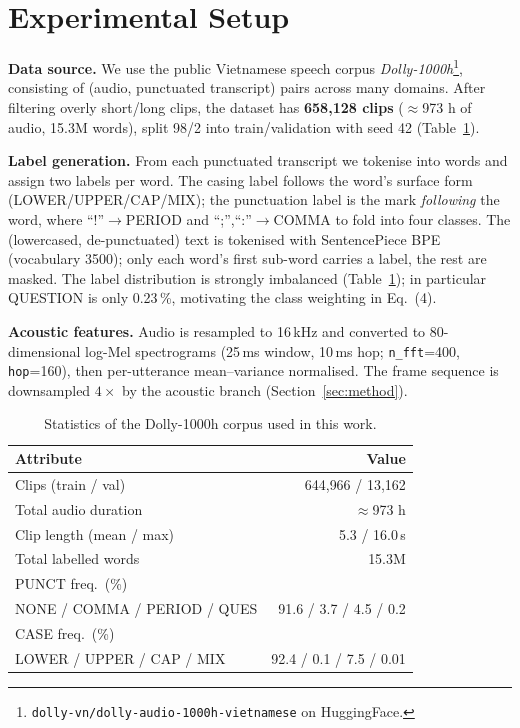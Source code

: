 \documentclass[conference]{IEEEtran}
\begin{document}
\section{Experimental Setup}

\textbf{Data source.} We use the public Vietnamese speech corpus
\emph{Dolly-1000h}\footnote{\texttt{dolly-vn/dolly-audio-1000h-vietnamese} on
HuggingFace.}, consisting of (audio, punctuated transcript) pairs across many
domains. After filtering overly short/long clips, the dataset has
\textbf{658{,}128 clips} ($\approx$973 h of audio, 15.3M words), split 98/2 into
train/validation with seed 42 (Table~\ref{tab:data}).

\textbf{Label generation.} From each punctuated transcript we tokenise into words
and assign two labels per word. The casing label follows the word's surface form
(LOWER/UPPER/CAP/MIX); the punctuation label is the mark \emph{following} the word,
where ``!''$\rightarrow$PERIOD and ``;'',``:''$\rightarrow$COMMA to fold into four
classes. The (lowercased, de-punctuated) text is tokenised with SentencePiece BPE
(vocabulary 3500); only each word's first sub-word carries a label, the rest are
masked. The label distribution is strongly imbalanced (Table~\ref{tab:data}); in
particular QUESTION is only 0.23\,\%, motivating the class weighting in Eq.~(4).

\textbf{Acoustic features.} Audio is resampled to 16\,kHz and converted to
80-dimensional log-Mel spectrograms (25\,ms window, 10\,ms hop; \texttt{n\_fft}=400,
\texttt{hop}=160), then per-utterance mean--variance normalised. The frame sequence
is downsampled $4\times$ by the acoustic branch (Section~\ref{sec:method}).

\begin{table}[t]
\caption{Statistics of the Dolly-1000h corpus used in this work.}
\label{tab:data}
\centering
\small
\setlength{\tabcolsep}{4pt}
\begin{tabular}{lr}
\toprule
Attribute & Value \\
\midrule
Clips (train / val)         & 644{,}966 / 13{,}162 \\
Total audio duration        & $\approx$973 h \\
Clip length (mean / max)    & 5.3 / 16.0\,s \\
Total labelled words        & 15.3M \\
\midrule
PUNCT freq.\ (\%) & \\
\quad NONE / COMMA / PERIOD / QUES & 91.6 / 3.7 / 4.5 / 0.2 \\
CASE freq.\ (\%) & \\
\quad LOWER / UPPER / CAP / MIX    & 92.4 / 0.1 / 7.5 / 0.01 \\
\bottomrule
\end{tabular}
\end{table}
\end{document}
